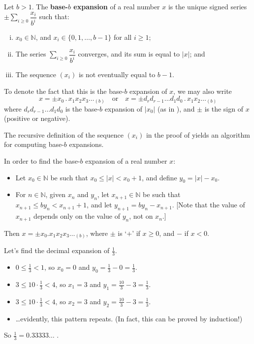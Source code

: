 \begin{definition}
\label{defBaseBExpansionOfRealNumber}
Let $b > 1$. The \textbf{base-$b$ expansion} of a real number $x$ is the unique signed series $\displaystyle \pm \sum_{i \ge 0} \dfrac{x_i}{b^i}$ such that:
\begin{enumerate}[(i)]
\item $x_0 \in \mathbb{N}$, and $x_i \in \{ 0, 1, \dots, b-1 \}$ for all $i \ge 1$;
\item The series $\displaystyle \sum_{i \ge 0} \dfrac{x_i}{b^i}$ converges, and its sum is equal to $|x|$; and
\item The sequence $(x_i)$ is not eventually equal to $b-1$.
\end{enumerate}
To denote the fact that this is the base-$b$ expansion of $x$, we may also write
\[ x = \pm x_0\,.\,x_1x_2x_3\dots{}_{(b)} \quad \text{or} \quad x = \pm d_rd_{r-1} \dots d_1d_0\,.\,x_1x_2\dots_{(b)} \]
where $d_rd_{r-1} \dots d_1d_0$ is the base-$b$ expansion of $|x_0|$ (as in ), and $\pm$ is the sign of $x$ (positive or negative).
\end{definition}

The recursive definition of the sequence $(x_i)$ in the proof of  yields an algorithm for computing base-$b$ expansions.

\begin{strategy}
\label{strFindingBaseBExpansions}
In order to find the base-$b$ expansion of a real number $x$:
\begin{itemize}
\item Let $x_0 \in \mathbb{N}$ be such that $x_0 \le |x| < x_0+1$, and define $y_0 = |x|-x_0$.
\item For $n \in \mathbb{N}$, given $x_n$ and $y_n$, let $x_{n+1} \in \mathbb{N}$ be such that $x_{n+1} \le by_n < x_{n+1}+1$, and let $y_{n+1} = by_n - x_{n+1}$. [Note that the value of $x_{n+1}$ depends only on the value of $y_n$, not on $x_n$.]
\end{itemize}
Then $x = \pm x_0.x_1x_2x_3\dots{}_{(b)}$, where $\pm$ is `$+$' if $x \ge 0$, and $-$ if $x<0$.
\end{strategy}

\begin{example}
Let's find the decimal expansion of $\frac{1}{3}$.
\begin{itemize}
\item $0 \le \frac{1}{3} < 1$, so $x_0 = 0$ and $y_0 = \frac{1}{3} - 0 = \frac{1}{3}$.
\item $3 \le 10 \cdot \frac{1}{3} < 4$, so $x_1 = 3$ and $y_1 = \frac{10}{3} - 3 = \frac{1}{3}$.
\item $3 \le 10 \cdot \frac{1}{3} < 4$, so $x_2 = 3$ and $y_2 = \frac{10}{3} - 3 = \frac{1}{3}$.
\item \dots{}evidently, this pattern repeats. (In fact, this can be proved by induction!)
\end{itemize}
So $\frac{1}{3} = 0.33333\dots{}$ .
\end{example}

